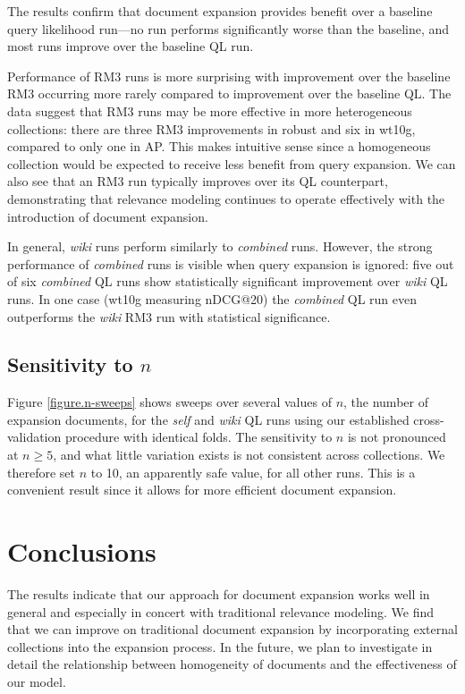\documentclass{sig-alternate}
\begin{document}
The results confirm that document expansion provides benefit over a baseline query likelihood run---no run performs significantly worse than the baseline, and most runs improve over the baseline QL run. %

Performance of RM3 runs is more surprising with improvement over the baseline RM3 occurring more rarely compared to improvement over the baseline QL. The data suggest that RM3 runs may be more effective in more heterogeneous collections: there are three RM3 improvements in robust and six in wt10g, compared to only one in AP. This makes intuitive sense since a homogeneous collection would be expected to receive less benefit from query expansion. We can also see that an RM3 run typically improves over its QL counterpart, demonstrating that relevance modeling continues to operate effectively with the introduction of document expansion.

In general, \textit{wiki} runs perform similarly to \textit{combined} runs. However, the strong performance of \textit{combined} runs is visible when query expansion is ignored: five out of six \textit{combined} QL runs show statistically significant improvement over \textit{wiki} QL runs. In one case (wt10g measuring nDCG@20) the \textit{combined} QL run even outperforms the \textit{wiki} RM3 run with statistical significance.

\subsection{Sensitivity to \boldmath$n$}\label{section.n-sensitivity}

Figure \ref{figure.n-sweeps} shows sweeps over several values of $n$, the number of expansion documents, for the \textit{self} and \textit{wiki} QL runs using our established cross-validation procedure with identical folds. The sensitivity to $n$ is not pronounced at $n \geq 5$, and what little variation exists is not consistent across collections. We therefore set $n$ to 10, an apparently safe value, for all other runs. This is a convenient result since it allows for more efficient document expansion.

\section{Conclusions}\label{section.conclusions}

The results indicate that our approach for document expansion works well in general and especially in concert with traditional relevance modeling. We find that we can improve on traditional document expansion by incorporating external collections into the expansion process. In the future, we plan to investigate in detail the relationship between homogeneity of documents and the effectiveness of our model.
\end{document}
